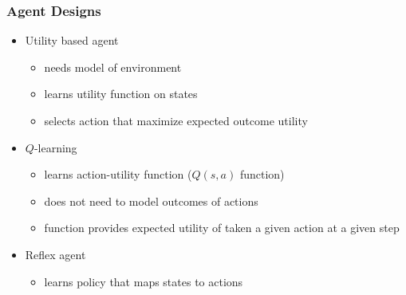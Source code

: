 \documentclass[UTF8,11pt,colorlinks,compress,openany]{beamer}%
\begin{document}
\begin{frame}\frametitle{Agent Designs}
\begin{itemize}
	\item Utility based agent
	\begin{itemize}
		\item needs model of environment
		\item learns utility function on states
		\item selects action that maximize expected outcome utility
	\end{itemize}
	\item $Q$-learning
	\begin{itemize}
		\item learns action-utility function ($Q(s,a)$ function)
		\item does not need to model outcomes of actions
		\item function provides expected utility of taken a given action at a given step
	\end{itemize}
	\item Reflex agent
	\begin{itemize}
		\item learns policy that maps states to actions
	\end{itemize}
\end{itemize}
\end{frame}
\end{document}
